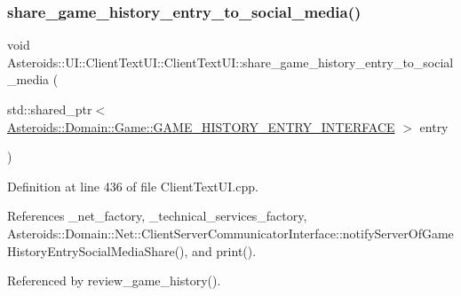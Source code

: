 \subsubsection{\texorpdfstring{share\+\_\+game\+\_\+history\+\_\+entry\+\_\+to\+\_\+social\+\_\+media()}{share\_game\_history\_entry\_to\_social\_media()}}
{\footnotesize\ttfamily void Asteroids\+::\+U\+I\+::\+Client\+Text\+U\+I\+::\+Client\+Text\+U\+I\+::share\+\_\+game\+\_\+history\+\_\+entry\+\_\+to\+\_\+social\+\_\+media (\begin{DoxyParamCaption}\item[{std\+::shared\+\_\+ptr$<$ \hyperlink{classAsteroids_1_1Domain_1_1Game_1_1GAME__HISTORY__ENTRY__INTERFACE}{Asteroids\+::\+Domain\+::\+Game\+::\+G\+A\+M\+E\+\_\+\+H\+I\+S\+T\+O\+R\+Y\+\_\+\+E\+N\+T\+R\+Y\+\_\+\+I\+N\+T\+E\+R\+F\+A\+CE} $>$}]{entry }\end{DoxyParamCaption})\hspace{0.3cm}{\ttfamily [private]}}



Definition at line 436 of file Client\+Text\+U\+I.\+cpp.



References \+\_\+net\+\_\+factory, \+\_\+technical\+\_\+services\+\_\+factory, Asteroids\+::\+Domain\+::\+Net\+::\+Client\+Server\+Communicator\+Interface\+::notify\+Server\+Of\+Game\+History\+Entry\+Social\+Media\+Share(), and print().



Referenced by review\+\_\+game\+\_\+history().

